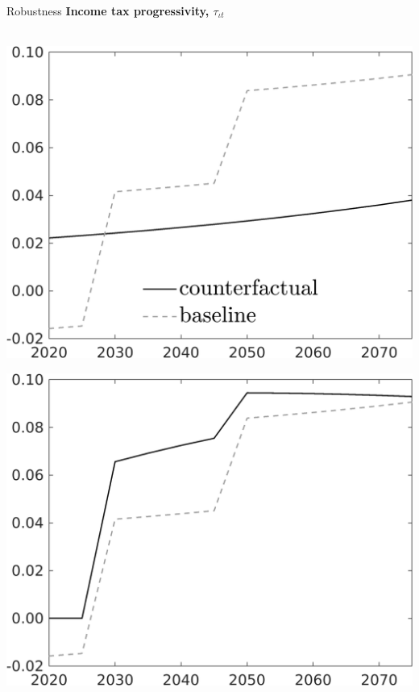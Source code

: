 \documentclass[11pt,aspectratio=169]{beamer}
\begin{document}
\begin{frame}{Robustness}
	\hypertarget{robustness}{}
	\centering \textbf{Income tax progressivity, $\tau_{\iota t}$}\\ \ \\
	\begin{minipage}[]{0.3\textwidth}
		\includegraphics[width=1\textwidth]{../codding_model/own_basedOnFried/optimalPol_elastS_DisuSci/figures/all_1705/SingleROB_extern_OPT_T_NoTaus_taul_spillover0_noskill0_sep1_BN0_ineq0_red0_etaa0.79_lgd1.png}
	\end{minipage}
	\begin{minipage}[]{0.3\textwidth}
		\includegraphics[width=1\textwidth]{../codding_model/own_basedOnFried/optimalPol_elastS_DisuSci/figures/all_1705/SingleROB_xgrowth_OPT_T_NoTaus_taul_spillover0_noskill0_sep1_BN0_ineq0_red0_etaa0.79_lgd0.png}

\end{minipage}
\end{frame}
\end{document}
